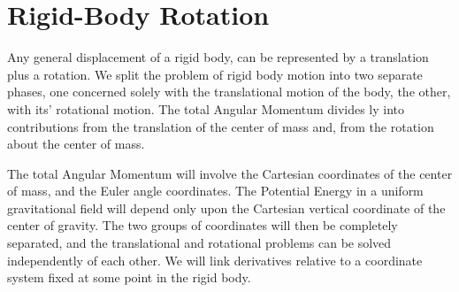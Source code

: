 \documentclass[a4paper, 10pt, onepage]{elegantbook}
\begin{document}
{\section{Rigid-Body Rotation}

Any general displacement of a rigid body, can be represented by a translation plus a rotation. We split the problem of 
rigid body motion into two separate phases, one concerned solely with the translational motion of the body, the other, 
with its' rotational motion. The total
Angular Momentum divides ly into contributions from the translation of the center of mass and, from the rotation 
about the center of mass.

The total Angular Momentum will involve the Cartesian coordinates of the center of mass, and
the Euler angle coordinates. The Potential Energy in a uniform gravitational field will depend only upon the Cartesian 
vertical coordinate of the center of gravity. The two groups of coordinates will then be completely separated, and the 
translational and rotational problems can be solved independently of each other. We will link derivatives relative to a 
coordinate system fixed at some point in the rigid body.

}
\end{document}
